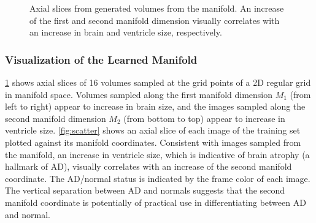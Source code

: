 \begin{figure}[tb!]
\centering
  

\caption[Axial slices from generated volumes from the manifold]{Axial slices
from generated volumes from the manifold. An increase of the first and second manifold dimension visually correlates with an increase in
brain and ventricle size, respectively.}
\label{fig:generated}
\end{figure}

\subsubsection{Visualization of the Learned Manifold}

\ref{fig:generated} shows axial slices of 16 volumes sampled at the grid points
of a 2D regular grid in manifold space. Volumes sampled along the first manifold
dimension $M_1$ (from left to right) appear to increase in brain size, and the
images sampled along the second manifold dimension $M_2$ (from bottom to top)
appear to increase in ventricle size. \ref{fig:scatter} shows an axial slice of
each image of the training set plotted against its manifold coordinates.
Consistent with images sampled from the manifold, an increase in ventricle size,
which is indicative of brain atrophy (a hallmark of AD), visually correlates
with an increase of the second manifold coordinate. The AD/normal status is
indicated by the frame color of each image. The vertical separation between AD
and normals suggests that the second manifold coordinate is potentially of
practical use in differentiating between AD and normal.

